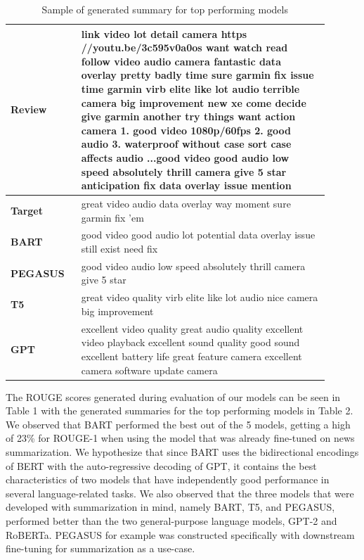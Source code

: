 \documentclass{article}
\begin{document}
\begin{table}[H]
\caption{Sample of generated summary for top performing models}
\renewcommand{\arraystretch}{1.5}
	\centering
	\begin{tabular}{p{0.2\linewidth} | p{0.7\linewidth} }
		\hline
		\multirow{2}{4em}{\textbf{Review}} & link video lot detail camera https //youtu.be/3c595v0a0os want watch read follow video audio camera fantastic data overlay pretty badly time sure garmin fix issue time garmin virb elite like lot audio terrible camera big improvement new xe come decide give garmin another try things want action camera 1. good video 1080p/60fps 2. good audio 3. waterproof without case sort case affects audio ...good video good audio low speed absolutely thrill camera give 5 star anticipation fix data overlay issue mention\\ 
		\hline
		\multirow{1}{4em}{\textbf{Target}} & great video audio data overlay way moment sure garmin fix 'em\\
		\hline
		\hline
		\multirow{1}{4em}{\textbf{BART} } 
         & good video good audio lot potential data overlay issue still exist need fix\\
        \hline
		\multirow{1}{4em}{\textbf{PEGASUS}}  & good video audio low speed absolutely thrill camera give 5 star \\
		\hline
		\multirow{1}{4em}{\textbf{T5} } 
        & great video quality virb elite like lot audio nice camera big improvement\\
        \hline
		\multirow{1}{4em}{\textbf{GPT}}  &  excellent video quality great audio quality excellent video playback excellent sound quality good sound excellent battery life great feature camera excellent camera software update camera \\
		\hline
	\end{tabular}
\end{table}
The ROUGE scores generated during evaluation of our models can be seen in Table 1 with the generated summaries for the top performing models in Table 2. We observed that BART performed the best out of the 5 models, getting a high of 23\%  for ROUGE-1 when using the model that was already fine-tuned on news summarization.  We hypothesize that since BART uses the bidirectional encodings of BERT with the auto-regressive decoding of GPT, it contains the best characteristics of two models that have independently good performance in several language-related tasks. We also observed that the three models that were developed with summarization in mind, namely BART, T5, and PEGASUS, performed better than the two general-purpose language models, GPT-2 and RoBERTa. PEGASUS for example was constructed specifically with downstream fine-tuning for summarization as a use-case.
\end{document}
